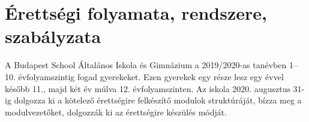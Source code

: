 \section{Érettségi folyamata, rendszere, szabályzata}
\label{sec:erettsegi_kesobb}
A Budapest School Általános Iskola és Gimnázium a 2019/2020-as tanévben 1--10. évfolyamszintig fogad gyerekeket. Ezen gyerekek egy része lesz egy évvel később 11., majd két év múlva 12. évfolyamszinten. Az iskola 2020. augusztus 31-ig dolgozza ki a kötelező érettségire felkészítő modulok struktúráját, bízza meg a modulvezetőket, dolgozzák ki az érettségire készülés módját. 